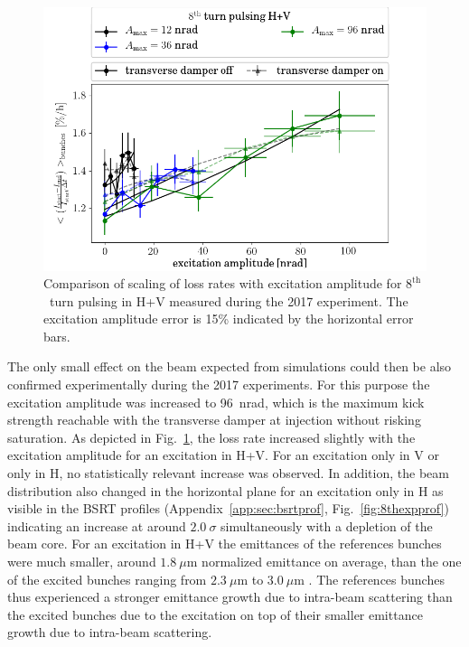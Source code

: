 \documentclass[%
 reprint,
 amsmath,amssymb,
 aps,
prstab,
]{revtex4-1}
\begin{document}
\begin{figure}[h]
	\centering
	\includegraphics[width=1.0\linewidth]{2017_scale_amp_8hv_lbllong.png}
	\caption{\label{fig:8thexploss} Comparison of scaling of loss rates with excitation amplitude for $8^{\mathrm{th}}$~turn pulsing in H+V measured during the 2017 experiment. The excitation amplitude error is 15\% indicated by the horizontal error bars.}
\end{figure}
The only small effect on the beam expected from simulations could then be also confirmed experimentally during the 2017 experiments. For this purpose the excitation amplitude was increased to 96~nrad, which is the maximum kick strength reachable with the transverse damper at injection without risking saturation. As depicted in Fig.~\ref{fig:8thexploss}, the loss rate increased slightly with the excitation amplitude for an excitation in H+V. For an excitation only in V or only in H, no statistically relevant increase was observed. In addition, the beam distribution also changed in the horizontal plane for an excitation only in H as visible in the BSRT profiles (Appendix~\ref{app:sec:bsrtprof}, Fig.~\ref{fig:8thexpprof}) indicating an increase at around $2.0~\sigma$ simultaneously with a depletion of the beam core. For an excitation in H+V the emittances of the references bunches were much smaller, around $1.8~\mu$m normalized emittance on average, than the one of the excited bunches ranging from $2.3~\mu$m to $3.0~\mu$m \cite{resexmd2017}. The references bunches thus experienced a stronger emittance growth due to intra-beam scattering than the excited bunches due to the excitation on top of their smaller emittance growth due to intra-beam scattering. 
 
\end{document}
